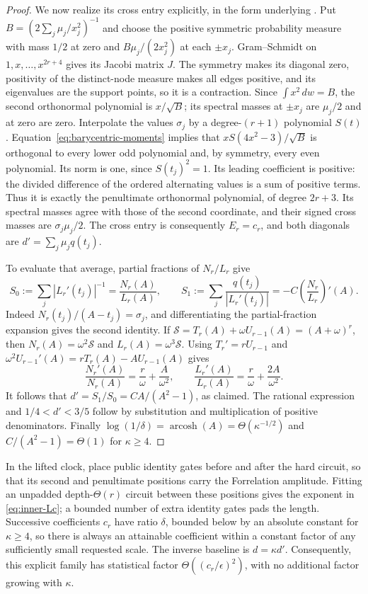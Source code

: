 \begin{proof}
We now realize its cross entry explicitly, in the form underlying
\citet[Lemma 2.5]{MontanaroShao2023}. Put
$B=(2\sum_j\mu_j/x_j^2)^{-1}$ and choose the positive symmetric
probability measure with mass $1/2$ at zero and
$B\mu_j/(2x_j^2)$ at each $\pm x_j$.
Gram--Schmidt on $1,x,\ldots,x^{2r+4}$ gives its Jacobi matrix $J$.
The symmetry makes its diagonal zero, positivity of the distinct-node
measure makes all edges positive, and its eigenvalues are the support
points, so it is a contraction. Since $\int x^2\,dw=B$, the second
orthonormal polynomial is $x/\sqrt B$; its spectral masses at
$\pm x_j$ are $\mu_j/2$ and at zero are zero.
Interpolate the values $\sigma_j$ by a degree-$(r+1)$ polynomial
$S(t)$. Equation~\eqref{eq:barycentric-moments} implies that
$xS(4x^2-3)/\sqrt B$ is orthogonal to every lower odd polynomial
and, by symmetry, every even polynomial. Its norm is one, since
$S(t_j)^2=1$. Its leading coefficient is positive: the divided
difference of the ordered alternating values is a sum of positive
terms. Thus it is exactly the penultimate orthonormal polynomial,
of degree $2r+3$. Its spectral masses agree with those of the second
coordinate, and their signed cross masses are $\sigma_j\mu_j/2$.
The cross entry is consequently $E_r=c_r$, and both diagonals are
$d'=\sum_j\mu_jq(t_j)$.

To evaluate that average, partial fractions of $N_r/L_r$ give
\[
 S_0:=\sum_j|L_r'(t_j)|^{-1}=\frac{N_r(A)}{L_r(A)},\qquad
 S_1:=\sum_j\frac{q(t_j)}{|L_r'(t_j)|}
       =-C\left(\frac{N_r}{L_r}\right)'(A).
\]
Indeed $N_r(t_j)/(A-t_j)=\sigma_j$, and differentiating the
partial-fraction expansion gives the second identity. If
$\mathcal S=T_r(A)+\omega U_{r-1}(A)=(A+\omega)^r$, then
$N_r(A)=\omega^2\mathcal S$ and $L_r(A)=\omega^3\mathcal S$.
Using $T_r'=rU_{r-1}$ and
$\omega^2U_{r-1}'(A)=rT_r(A)-AU_{r-1}(A)$ gives
\[
 \frac{N_r'(A)}{N_r(A)}=\frac r\omega+\frac A{\omega^2},\qquad
 \frac{L_r'(A)}{L_r(A)}=\frac r\omega+\frac{2A}{\omega^2}.
\]
It follows that $d'=S_1/S_0=CA/(A^2-1)$, as claimed.
The rational expression and $1/4<d'<3/5$ follow by substitution
and multiplication of positive denominators. Finally
$\log(1/\delta)=\operatorname{arcosh}(A)=\Theta(\kappa^{-1/2})$
and $C/(A^2-1)=\Theta(1)$ for $\kappa\geq4$.
\end{proof}

In the lifted clock, place public identity gates before and after the
hard circuit, so that its second and penultimate positions carry the
Forrelation amplitude. Fitting an unpadded depth-$\Theta(r)$ circuit
between these positions gives the exponent in \eqref{eq:inner-Lc};
a bounded number of extra identity gates pads the length.
Successive coefficients $c_r$ have ratio $\delta$, bounded below by
an absolute constant for $\kappa\geq4$, so there is always an
attainable coefficient within a constant factor of any sufficiently
small requested scale. The inverse baseline is $d=\kappa d'$.
Consequently, this explicit family has statistical factor
$\Theta((c_r/\epsilon)^2)$, with no additional factor growing with
$\kappa$.


